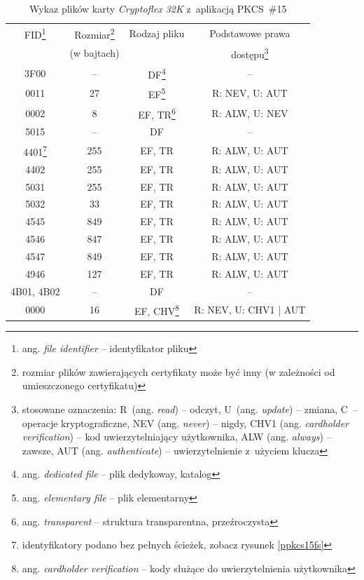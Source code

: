 \begin{table}
\centering
\caption{Wykaz plików karty {\it Cryptoflex 32K} z~aplikacją PKCS~\#15}
\label{tab:card}
\begin{minipage}{.9\textwidth}
\setlength{\baselineskip}{2mm}
\centering
\begin{tabular}{c|c|c|c}
FID\footnote{ang. {\em file identifier} -- identyfikator pliku} & Rozmiar\footnote{rozmiar plików zawierających certyfikaty może być inny (w zależności od umieszczonego certyfikatu)} & Rodzaj pliku & Podstawowe prawa\\
 & (w bajtach) & & dostępu\footnote{stosowane oznaczenia: R~(ang. {\em read}) -- odczyt, U~(ang. {\em update}) -- zmiana, C~-- operacje kryptograficzne, NEV (ang. {\em never}) -- nigdy, CHV1 (ang. {\em cardholder verification}) -- kod uwierzytelniający użytkownika, ALW (ang. {\em always}) -- zawsze, AUT (ang. {\em authenticate}) -- uwierzytelnienie z~użyciem klucza}\\ \hline
3F00		    & --		   & DF\footnote{ang. {\em dedicated file} -- plik dedykoway, katalog}	& -- \\ \hline
0011		    & 27		   & EF\footnote{ang. {\em elementary file} -- plik elementarny}	& R: NEV, U: AUT \\ \hline
0002		    & 8			   & EF, TR\footnote{ang. {\em transparent} -- struktura transparentna, przeźroczysta} & R: ALW, U: NEV \\ \hline
5015		    & --		   & DF		    & -- \\ \hline
4401\footnote{identyfikatory podano bez pełnych ścieżek, zobacz rysunek \ref{ppkcs15fs}}	    & 255		   & EF, TR		    & R: ALW, U: AUT \\ \hline
4402		    & 255		   & EF, TR		    & R: ALW, U: AUT \\ \hline
5031		    & 255		   & EF, TR		    & R: ALW, U: AUT \\ \hline
5032		    & 33		   & EF, TR		    & R: ALW, U: AUT \\ \hline
4545		    & 849		   & EF, TR		    & R: ALW, U: AUT \\ \hline
4546		    & 847		   & EF, TR		    & R: ALW, U: AUT \\ \hline
4547		    & 849		   & EF, TR		    & R: ALW, U: AUT \\ \hline
4946		    & 127		   & EF, TR		    & R: ALW, U: AUT \\ \hline
4B01, 4B02	    & --		   & DF		    & -- \\ \hline
0000		    & 16		   & EF, CHV\footnote{ang. {\em cardholder verification} -- kody służące do uwierzytelnienia użytkownika} & R: NEV, U: CHV1 | AUT \\ \hline

\end{tabular}
\end{minipage}
\end{table}
